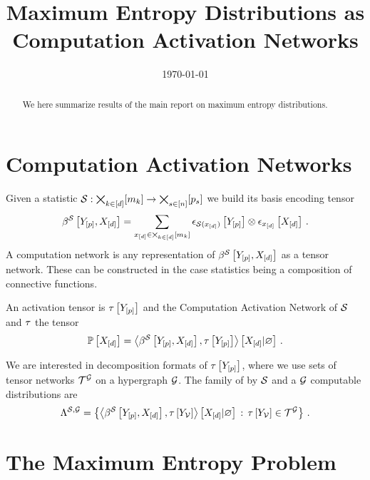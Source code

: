 \documentclass[aps,onecolumn,nofootinbib,pra]{article}
\begin{document}
    \title{Maximum Entropy Distributions as Computation Activation Networks}

    \maketitle
    \date{\today}

    \begin{abstract}
        We here summarize results of the main report on maximum entropy distributions.
    \end{abstract}


    \section{Computation Activation Networks}

    Given a statistic $\mathcal{S}:\bigtimes_{k\in[d]}[m_{k}]\rightarrow\bigtimes_{s\in[n]}[p_{s}]$ we build its basis encoding tensor
    \begin{align*}
        \beta^{\mathcal{S}}\left[Y_{[p]},X_{[d]}\right] = \sum_{x_{[d]}\in\bigtimes_{k\in[d]}[m_{k}]} \epsilon_{\mathcal{S}(x_{[d]})}\left[Y_{[p]}\right] \otimes \epsilon_{x_{[d]}}\left[X_{[d]}\right] \, .
    \end{align*}
    A computation network is any representation of $\beta^{\mathcal{S}}\left[Y_{[p]},X_{[d]}\right]$ as a tensor network.
    These can be constructed in the case statistics being a composition of connective functions.

    An activation tensor is $\tau\left[Y_{[p]}\right]$ and the Computation Activation Network of $\mathcal{S}$ and $\tau$ the tensor
    \begin{align*}
        \mathbb{P}\left[X_{[d]}\right] = \left\langle \beta^{\mathcal{S}}\left[Y_{[p]},X_{[d]}\right],\tau\left[Y_{[p]}\right]\right\rangle \left[ X_{[d]} | \varnothing \right] \, .
    \end{align*}

    We are interested in decomposition formats of $\tau\left[Y_{[p]}\right]$, where we use sets of tensor networks $\mathcal{T}^{\mathcal{G}}$ on a hypergraph $\mathcal{G}$.
    The family of by $\mathcal{S}$ and a $\mathcal{G}$ computable distributions are
    \begin{align*}
        \Lambda^{\mathcal{S},\mathcal{G}}
        = \left\{ \left\langle \beta^{\mathcal{S}}\left[Y_{[p]},X_{[d]}\right],\tau\left[Y_{\mathcal{V}}\right]
        \right\rangle \left[ X_{[d]} | \varnothing \right]
        \,:\, \tau\left[Y_{\mathcal{V}}\right] \in \mathcal{T}^{\mathcal{G}} \right\} \, .
    \end{align*}


    \section{The Maximum Entropy Problem}
\end{document}
